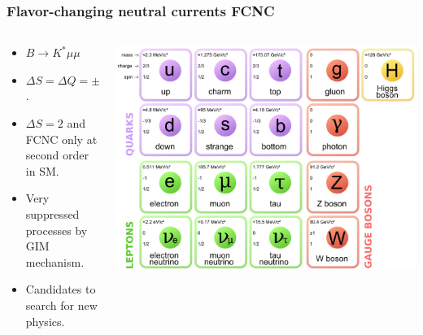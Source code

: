 \documentclass{beamer}
\begin{document}
\begin{frame}
\frametitle{Flavor-changing neutral currents FCNC }
\begin{columns}
	\begin{column}{0.5\textwidth}
	\begin{itemize}
		\item \(B\rightarrow K^*\mu\mu \)
		\item \(\Delta S = \Delta Q = \pm1 \).
		\item \(\Delta S = 2\) and FCNC only at second order in SM.
		\item Very suppressed processes by GIM mechanism.
		\item Candidates to search for new physics.
		
	\end{itemize}
	\end{column}
	\begin{column}{0.5\textwidth}  %
		\begin{center}
		
				\includegraphics[width=1\textwidth, height=0.5\textheight]{imagenes/Standard_Model_of_Elementary_Particles.jpg}
				\label{fig:Standard Model}
		\end{center}
	\end{column}
\end{columns}


\end{frame}
\end{document}
